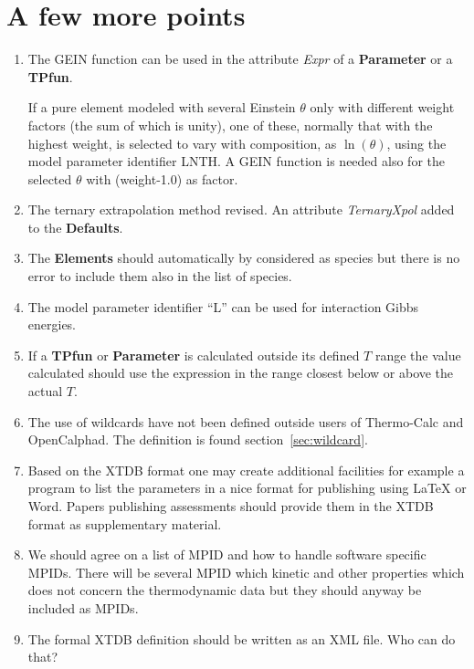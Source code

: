\documentclass{article}
\begin{document}
\section{A few more points}\label{sec:points}

\begin{enumerate}
\item The GEIN function can be used in the attribute {\em Expr} of a {\bf
  Parameter} or a {\bf TPfun}.

  If a pure element modeled with several Einstein $\theta$ only with
  different weight factors (the sum of which is unity), one of these,
  normally that with the highest weight, is selected to vary with
  composition, as $\ln(\theta)$, using the model parameter identifier
  LNTH.  A GEIN function is needed also for the selected $\theta$ with
  (weight-1.0) as factor.

\item The ternary extrapolation method revised.  An attribute {\em
  TernaryXpol} added to the {\bf Defaults}.

\item The {\bf Elements} should automatically by considered as species but
  there is no error to include them also in the list of species.

\item The model parameter identifier ``L'' can be used for interaction
  Gibbs energies.

\item If a {\bf TPfun} or {\bf Parameter} is calculated outside its
  defined $T$ range the value calculated should use the
  expression in the range closest below or above the actual $T$. 

\item The use of wildcards have not been defined outside users of
  Thermo-Calc and OpenCalphad.  The definition is found
  section~\ref{sec:wildcard}.

\item Based on the XTDB format one may create additional facilities
  for example a program to list the parameters in a nice format for
  publishing using LaTeX or Word.  Papers publishing assessments
  should provide them in the XTDB format as supplementary material.

\item We should agree on a list of MPID and how to handle software
  specific MPIDs.  There will be several MPID which kinetic and other
  properties which does not concern the thermodynamic data but they
  should anyway be included as MPIDs.

\item The formal XTDB definition should be written as an XML file.
  Who can do that?
  
\end{enumerate}
\end{document}
